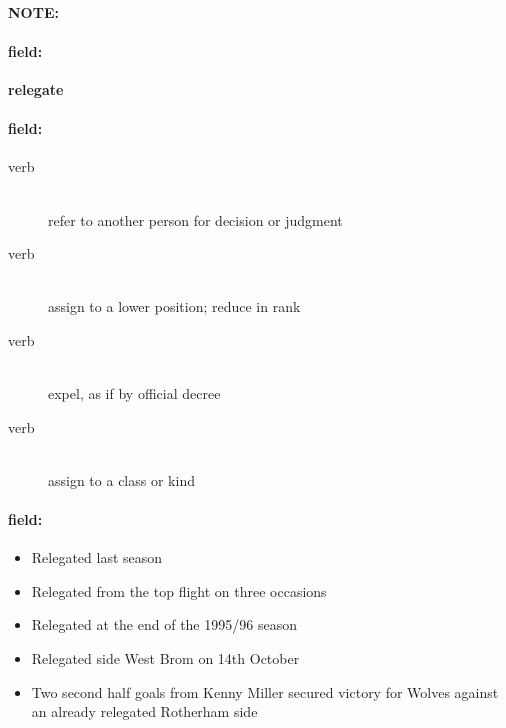 \documentclass[12pt]{article}
\newenvironment{note}{\paragraph{NOTE:}}{}
\newenvironment{field}{\paragraph{field:}}{}
\begin{document}
\begin{note}
\begin{field}
\textbf{\large relegate}
\end{field}


\begin{field}
\begin{description}
\item[verb] \hfill \\ 
refer to another person for decision or judgment

\item[verb] \hfill \\ 
assign to a lower position; reduce in rank

\item[verb] \hfill \\ 
expel, as if by official decree

\item[verb] \hfill \\ 
assign to a class or kind

\end{description}
\end{field}

\begin{field}
\begin{itemize}
\item Relegated last season
\item Relegated from the top flight on three occasions
\item Relegated at the end of the 1995/96 season
\item Relegated side West Brom on 14th October
\item Two second half goals from Kenny Miller secured victory for Wolves against an already relegated Rotherham side
\end{itemize}
\end{field}
\end{note}
\end{document}
